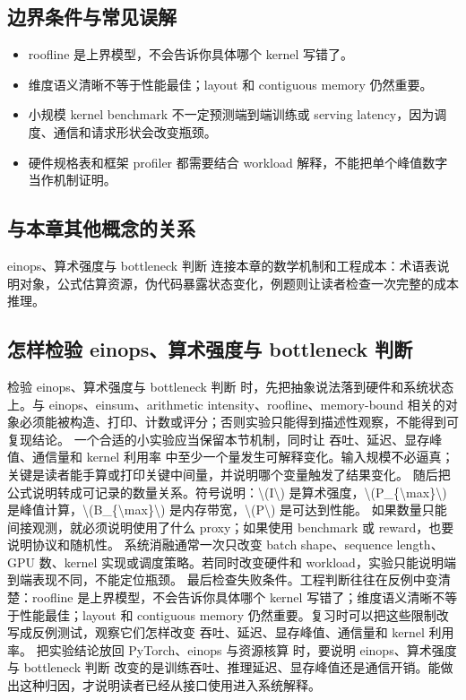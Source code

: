 \documentclass[a4paper]{article}
\begin{document}
\subsection{边界条件与常见误解}
\begin{itemize}
\item roofline 是上界模型，不会告诉你具体哪个 kernel 写错了。
\item 维度语义清晰不等于性能最佳；layout 和 contiguous memory 仍然重要。
\item 小规模 kernel benchmark 不一定预测端到端训练或 serving latency，因为调度、通信和请求形状会改变瓶颈。
\item 硬件规格表和框架 profiler 都需要结合 workload 解释，不能把单个峰值数字当作机制证明。
\end{itemize}
\subsection{与本章其他概念的关系}
einops、算术强度与 bottleneck 判断 连接本章的数学机制和工程成本：术语表说明对象，公式估算资源，伪代码暴露状态变化，例题则让读者检查一次完整的成本推理。
\subsection{怎样检验 einops、算术强度与 bottleneck 判断}
检验 einops、算术强度与 bottleneck 判断 时，先把抽象说法落到硬件和系统状态上。与 einops、einsum、arithmetic intensity、roofline、memory-bound 相关的对象必须能被构造、打印、计数或评分；否则实验只能得到描述性观察，不能得到可复现结论。
一个合适的小实验应当保留本节机制，同时让 吞吐、延迟、显存峰值、通信量和 kernel 利用率 中至少一个量发生可解释变化。输入规模不必逼真；关键是读者能手算或打印关键中间量，并说明哪个变量触发了结果变化。
随后把公式说明转成可记录的数量关系。符号说明：\textbackslash{}(I\textbackslash{}) 是算术强度，\textbackslash{}(P\_\{\textbackslash{}max\}\textbackslash{}) 是峰值计算，\textbackslash{}(B\_\{\textbackslash{}max\}\textbackslash{}) 是内存带宽，\textbackslash{}(P\textbackslash{}) 是可达到性能。 如果数量只能间接观测，就必须说明使用了什么 proxy；如果使用 benchmark 或 reward，也要说明协议和随机性。
系统消融通常一次只改变 batch shape、sequence length、GPU 数、kernel 实现或调度策略。若同时改变硬件和 workload，实验只能说明端到端表现不同，不能定位瓶颈。
最后检查失败条件。工程判断往往在反例中变清楚：roofline 是上界模型，不会告诉你具体哪个 kernel 写错了；维度语义清晰不等于性能最佳；layout 和 contiguous memory 仍然重要。复习时可以把这些限制改写成反例测试，观察它们怎样改变 吞吐、延迟、显存峰值、通信量和 kernel 利用率。
把实验结论放回 PyTorch、einops 与资源核算 时，要说明 einops、算术强度与 bottleneck 判断 改变的是训练吞吐、推理延迟、显存峰值还是通信开销。能做出这种归因，才说明读者已经从接口使用进入系统解释。
\end{document}
